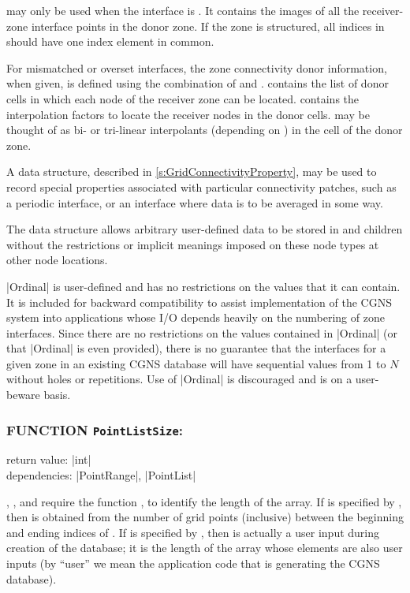  may only be used when the interface is
.
It contains the images of all the receiver-zone interface points in the
donor zone.
If the zone is structured, all indices in 
should have one index element in common.

For mismatched or overset interfaces, the zone connectivity donor
information, when given, is defined using the combination of
 and .
 contains the list of donor cells in which each node
of the receiver zone can be located.
 contains the interpolation factors to locate
the receiver nodes in the donor cells.
 may be thought of as bi- or tri-linear
interpolants (depending on ) in the cell of the
donor zone.

A  data structure, described in
\autoref{s:GridConnectivityProperty}, may be used to record special
properties associated with particular connectivity patches, such as a
periodic interface, or an interface where data is to be averaged in some
way.

The  data structure allows arbitrary
user-defined data to be stored in  and
 children without the restrictions or implicit
meanings imposed on these node types at other node locations.

|Ordinal| is user-defined and has no restrictions on the values that it can
contain.  It is included for backward compatibility to assist implementation
of the CGNS system into applications whose I/O depends heavily on the
numbering of zone interfaces.  Since there are no restrictions on the values
contained in |Ordinal| (or that |Ordinal| is even provided), there is no
guarantee that the interfaces for a given zone in an existing CGNS database
will have sequential values from 1 to $N$ without holes or repetitions.  Use
of |Ordinal| is discouraged and is on a user-beware basis.

\subsubsection*{FUNCTION \texttt{PointListSize}:}

\noindent return value: |int| \\
\noindent dependencies: |PointRange|, |PointList|

, , and 
require the function , to identify the length of the
array.
If  is specified by ,
then  is obtained from the number of grid points
(inclusive) between the beginning and ending indices of .
If  is specified by ,
then  is actually a user input during creation of
the database; it is the length of the array  whose
elements are also user inputs (by ``user'' we mean the application code
that is generating the CGNS database).

